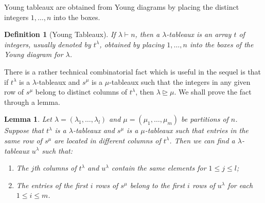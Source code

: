 \documentclass{assignment}[2019/10/15]
\theoremstyle{plain}
\newtheorem{definition}[theorem]{Definition}
\newtheorem{lemma}[theorem]{Lemma}
\begin{document}
    Young tableaux are obtained from Young diagrams by placing the distinct integers $1, \dotsc, n$ into the boxes.

    \begin{definition}[Young Tableaux]
        If $\lambda\vdash n$, then a $\lambda$-\emph{tableaux} is an array $t$ of integers, usually denoted by $t^\lambda$, obtained by placing $1, \dotsc, n$ into the boxes of the Young diagram for $\lambda$.
    \end{definition}

    There is a rather technical combinatorial fact which is useful in the sequel is that if $t^\lambda$ is a $\lambda$-tableaux and $s^\mu$ is a $\mu$-tableaux such that the integers in any given row of $s^\mu$ belong to distinct columns of $t^\lambda$, then $\lambda\unrhd\mu$. We shall prove the fact through a lemma.

    \begin{lemma}\label{lem: tableaux}
        Let $\lambda = (\lambda_1, \dotsc, \lambda_l)$ and $\mu = (\mu_1, \dotsc, \mu_m)$ be partitions of $n$. Suppose that $t^\lambda$ is a $\lambda$-tableaux and $s^\mu$ is a $\mu$-tableaux such that entries in the same row of $s^\mu$ are located in different columns of $t^\lambda$. Then we can find a $\lambda$-tableaux $u^\lambda$ such that:
        \begin{enumerate}
            \item The $j$th columns of $t^\lambda$ and $u^\lambda$ contain the same elements for $1\leq j \leq l$;
            \item The entries of the first $i$ rows of $s^\mu$ belong to the first $i$ rows of $u^\lambda$ for each $1\leq i \leq m$.
        \end{enumerate}
    \end{lemma}
\end{document}
